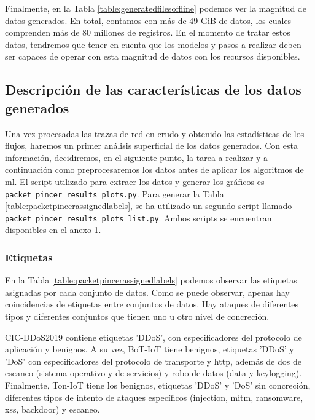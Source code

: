 Finalmente, en la Tabla \ref{table:generatedfilesoffline} podemos ver la magnitud de datos generados. En total, contamos con más de 49 GiB de datos, los cuales comprenden más de 80 millones de registros. En el momento de tratar estos datos, tendremos que tener en cuenta que los modelos y pasos a realizar deben ser capaces de operar con esta magnitud de datos con los recursos disponibles.

\subsection{Descripción de las características de los datos generados}

Una vez procesadas las trazas de red en crudo y obtenido las estadísticas de los flujos, haremos un primer análisis superficial de los datos generados. Con esta información, decidiremos, en el siguiente punto, la tarea a realizar y a continuación como preprocesaremos los datos antes de aplicar los algoritmos de \gls{ml}. El script utilizado para extraer los datos y generar los gráficos es \texttt{packet\_pincer\_results\_plots.py}. Para generar la Tabla \ref{table:packetpincerassignedlabels}, se ha utilizado un segundo script llamado \texttt{packet\_pincer\_results\_plots\_list.py}. Ambos scripts se encuentran disponibles en el anexo 1.

\subsubsection{Etiquetas}

En la Tabla \ref{table:packetpincerassignedlabels} podemos observar las etiquetas asignadas por cada conjunto de datos. Como se puede observar, apenas hay coincidencias de etiquetas entre conjuntos de datos. Hay ataques de diferentes tipos y diferentes conjuntos que tienen uno u otro nivel de concreción.



CIC-DDoS2019 contiene etiquetas 'DDoS', con especificadores del protocolo de aplicación y benignos. A su vez, BoT-IoT tiene benignos, etiquetas 'DDoS' y 'DoS' con especificadores del protocolo de transporte y \acrshort{http}, además de dos de escaneo (sistema operativo y de servicios) y robo de datos (data y keylogging). Finalmente, Ton-IoT tiene los benignos, etiquetas 'DDoS' y 'DoS' sin concreción, diferentes tipos de intento de ataques específicos (injection, mitm, ransomware, xss, backdoor) y escaneo.

